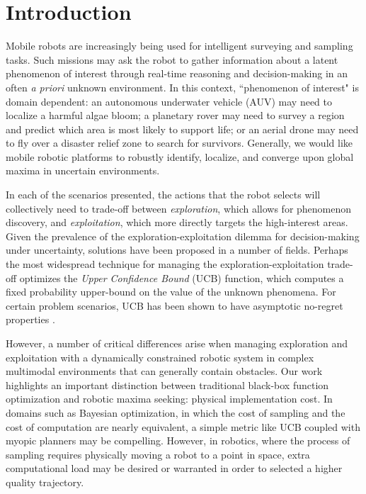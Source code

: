 \documentclass{styles/svproc}
\begin{document}
\section{Introduction}
\label{intro}
Mobile robots are increasingly being used for intelligent surveying and sampling tasks. Such missions may ask the robot to gather information about a latent phenomenon of interest through real-time reasoning and decision-making in an often \textit{a priori} unknown environment. In this context, ``phenomenon of interest" is domain dependent:  an autonomous underwater vehicle (AUV) may need to localize a harmful algae bloom; a planetary rover may need to survey a region and predict which area is most likely to support life; or an aerial drone may need to fly over a disaster relief zone to search for survivors. Generally, we would like mobile robotic platforms to robustly identify, localize, and converge upon global maxima in uncertain environments.

In each of the scenarios presented, the actions that the robot selects will collectively need to trade-off between \textit{exploration}, which allows for phenomenon discovery, and \textit{exploitation}, which more directly targets the high-interest areas. Given the prevalence of the exploration-exploitation dilemma for decision-making under uncertainty, solutions have been proposed in a number of fields.  Perhaps the most widespread technique for managing the exploration-exploitation trade-off optimizes the \textit{Upper Confidence Bound} (UCB) function, which computes a fixed probability upper-bound on the value of the unknown phenomena. For certain problem scenarios, UCB has been shown to have asymptotic no-regret properties \cite{Srinivas2012}. 

However, a number of critical differences arise when managing exploration and exploitation with a dynamically constrained robotic system in complex multimodal environments that can generally contain obstacles. Our work highlights an important distinction between traditional black-box function optimization and robotic maxima seeking: physical implementation cost. In domains such as Bayesian optimization, in which the cost of sampling and the cost of computation are nearly equivalent, a simple metric like UCB coupled with myopic planners may be compelling. However, in robotics, where the process of sampling requires physically moving a robot to a point in space, extra computational load may be desired or warranted in order to selected a higher quality trajectory. 
\end{document}
